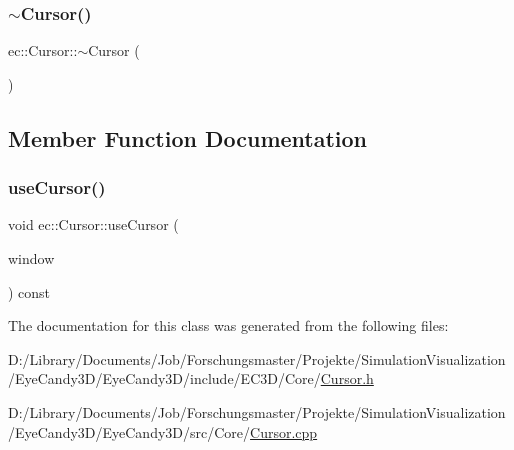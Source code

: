 \mbox{\label{classec_1_1_cursor_a4617172c5106164b27ef856df0b078c3}} 
\subsubsection{\texorpdfstring{$\sim$\+Cursor()}{~Cursor()}}
{\footnotesize\ttfamily ec\+::\+Cursor\+::$\sim$\+Cursor (\begin{DoxyParamCaption}{ }\end{DoxyParamCaption})\hspace{0.3cm}{\ttfamily [default]}}



\subsection{Member Function Documentation}
\mbox{\label{classec_1_1_cursor_ad99efc837c8f7fb348d2ea7c3bd230d4}} 
\subsubsection{\texorpdfstring{use\+Cursor()}{useCursor()}}
{\footnotesize\ttfamily void ec\+::\+Cursor\+::use\+Cursor (\begin{DoxyParamCaption}\item[{G\+L\+F\+Wwindow $\ast$}]{window }\end{DoxyParamCaption}) const}



The documentation for this class was generated from the following files\+:\begin{DoxyCompactItemize}
\item 
D\+:/\+Library/\+Documents/\+Job/\+Forschungsmaster/\+Projekte/\+Simulation\+Visualization/\+Eye\+Candy3\+D/\+Eye\+Candy3\+D/include/\+E\+C3\+D/\+Core/\mbox{\hyperlink{_cursor_8h}{Cursor.\+h}}\item 
D\+:/\+Library/\+Documents/\+Job/\+Forschungsmaster/\+Projekte/\+Simulation\+Visualization/\+Eye\+Candy3\+D/\+Eye\+Candy3\+D/src/\+Core/\mbox{\hyperlink{_cursor_8cpp}{Cursor.\+cpp}}\end{DoxyCompactItemize}
